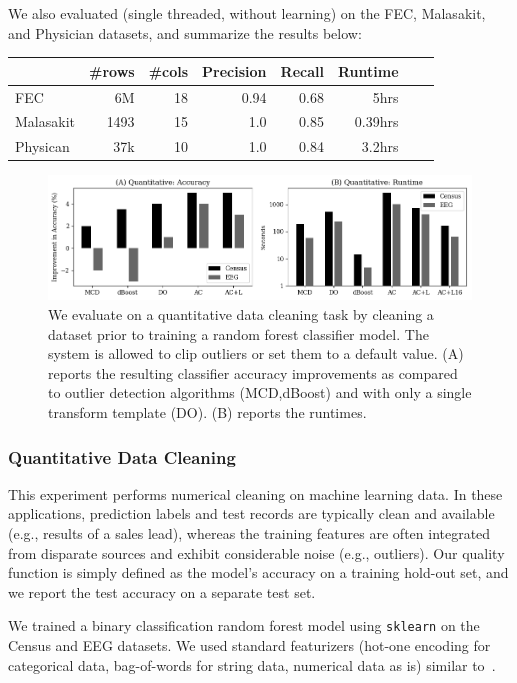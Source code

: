 We also evaluated \sys (single threaded, without learning) on the FEC, Malasakit, and Physician datasets, and summarize the results below:
\begin{table}[ht]
\footnotesize
\small
\centering
\begin{tabular}{|l|r|r|r|r|r|r|r|}
\hline
 & \#rows & \#cols & Precision & Recall & Runtime \\
\hline
\hline
FEC	&6M&18&0.94&	0.68&	5hrs\\
\hline
Malasakit &1493& 15& 1.0 & 0.85& 0.39hrs\\
\hline
Physican	&37k&10&1.0&0.84& 3.2hrs\\
\hline
\end{tabular}
\end{table}

\begin{figure}
    \centering
    \includegraphics[width=\columnwidth]{exp/exp2.png}
    \caption{We evaluate \sys on a quantitative data cleaning task by cleaning a dataset prior to training a random forest classifier model. The system is allowed to clip outliers or set them to a default value. (A) reports the resulting classifier accuracy improvements as compared to outlier detection algorithms (MCD,dBoost) and \sys with only a single transform template (DO).  (B) reports the runtimes.  \label{exp2a}}
\end{figure}

\subsubsection{Quantitative Data Cleaning}
This experiment performs numerical cleaning on machine learning data.  In these applications, prediction labels and test records are typically clean and available (e.g., results of a sales lead), whereas the training features are often integrated from disparate sources and exhibit considerable noise (e.g., outliers).  Our quality function is simply defined as the model's accuracy on a training hold-out set, and we report the test accuracy on a separate test set.

We trained a binary classification random forest model using \texttt{sklearn} on the Census and EEG datasets.  We used standard featurizers (hot-one encoding for categorical data, bag-of-words for string data, numerical data as is) similar to~\cite{gokhale2014corleone}. 



